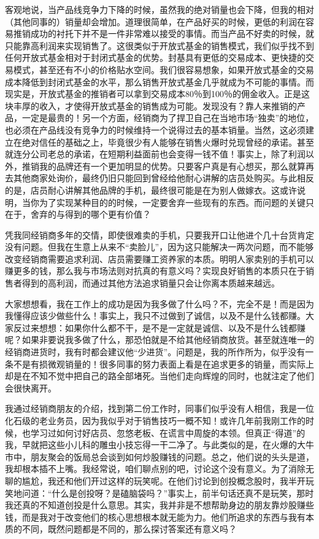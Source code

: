 客观地说，当产品线竞争力下降的时候，虽然我的绝对销量也会下降，但我的相对（其他同事的）销量却会增加。道理很简单，在产品好买的时候，更低的利润在容易推销成功的衬托下并不是一件非常难以接受的事情。而当产品不好卖的时候，就只能靠高利润来实现销售了。这很类似于开放式基金的销售模式，我们似乎找不到任何开放式基金相对于封闭式基金的优势。封基具有更低的交易成本、更快捷的交易模式，甚至还有不小的价格贴水空间。我们很容易想象，如果开放式基金的交易成本降低到封闭式基金的水平，那么销售开放式基金几乎就成为不可能的事情。而现实是，开放式基金的推销者可以拿到交易成本80％到100％的佣金收入。正是这块丰厚的收入，才使得开放式基金的销售成为可能。发现没有？靠人来推销的产品，一定是最贵的！另一个方面，经销商为了捍卫自己在当地市场“独卖”的地位，也必须在产品线没有竞争力的时候维持一个说得过去的基本销量。当然，这必须建立在绝对信任的基础之上，毕竟很少有人能够在销售火爆时兑现曾经的承诺。甚至就连分公司老总的承诺，在短期利益面前也会变得一钱不值！事实上，除了利润以外，推销我的品牌还有一个更加明显的优势。只要客户真是有心想买，那么就算再去其他商家处询价，最终仍旧只能回到曾经给他耐心讲解的店员处购买。与此相反的是，店员耐心讲解其他品牌的手机，最终很可能是在为别人做嫁衣。这或许说明，当你为了实现某种目的的时候，一定要舍弃一些现有的东西。而问题的关键只在于，舍弃的与得到的哪个更有价值？

凭我同经销商多年的交情，即使很难卖的手机，只要我开口让他进个几十台货肯定没有问题。但我在生意上从来不“卖脸儿”，因为这只能解决一两次问题，而不能够改变经销商需要追求利润、店员需要赚工资养家的本质。明明人家卖别的手机可以赚更多的钱，那么我与市场法则对抗真的有意义吗？实现良好销售的本质只在于销售者得到的高利润，而通过其他方法追求销量只会让你离本质越来越远。

大家想想看，我在工作上的成功是因为我多做了什么吗？不，完全不是！而是因为我懂得应该少做些什么！事实上，我只不过做到了诚信，以及不是什么钱都赚。大家反过来想想：如果你什么都不干，是不是一定就是诚信、以及不是什么钱都赚呢？如果非要说我多做了什么，那恐怕就是不给其他经销商放货。甚至就连唯一的经销商进货时，我有时都会建议他“少进货”。问题是，我的所作所为，似乎没有一条不是有损微观销量的！很多同事的努力表面上看是在追求更多的销量，而实际上却是在不知不觉中把自己的路全部堵死。当他们走向辉煌的同时，也就注定了他们会很快离开。

我通过经销商朋友的介绍，找到第二份工作时，同事们似乎没有人相信，我是一位化石级的老业务员，因为我似乎对于销售技巧一概不知！或许几年前我刚工作的时候，也学习过如何讨好店员、忽悠老板、在谎言中周旋的本领。但真正“得道”的我，早就把这些小儿科的雕虫小技忘得一干二净了。与此类似的是，在火爆的大牛市中，朋友聚会的饭局总会谈到如何炒股赚钱的问题。总之，他们说的头头是道，我却根本插不上嘴。我经常说，咱们聊点别的吧，讨论这个没有意义。为了消除无聊的尴尬，我还和他们开过这样的玩笑呢。在他们讨论到创投概念股时，我半开玩笑地问道：“什么是创投呀？是磕脑袋吗？”事实上，前半句话还真不是玩笑，那时我还真的不知道创投是什么意思。其实，我并非是不想帮助身边的朋友靠炒股赚些钱，而是我对于改变他们的核心思想根本就无能为力。他们所追求的东西与我有本质的不同，既然问题都是不同的，那么探讨答案还有意义吗？

